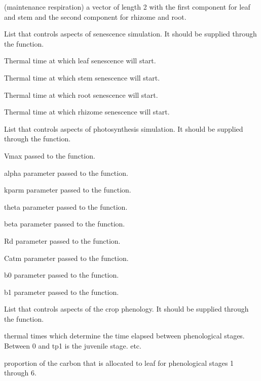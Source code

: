 \documentclass[letterpaper]{book}
\begin{document}
\begin{Arguments}
\begin{ldescription}
 (maintenance respiration) a vector of length
2 with the first component for leaf and stem and the
second component for rhizome and root.

\item[\code{seneControl}] List that controls aspects of
senescence simulation. It should be supplied through the
 function.

 Thermal time at which leaf senescence will
start.

 Thermal time at which stem senescence will
start.

 Thermal time at which root senescence will
start.

 Thermal time at which rhizome
senescence will start.

\item[\code{photoControl}] List that controls aspects of
photosynthesis simulation. It should be supplied through
the  function.

 Vmax passed to the 
function.

 alpha parameter passed to the
 function.

 kparm parameter passed to the
 function.

 theta parameter passed to the
 function.

 beta parameter passed to the
 function.

 Rd parameter passed to the
 function.

 Catm parameter passed to the
 function.

 b0 parameter passed to the
 function.

 b1 parameter passed to the
 function.

\item[\code{phenoControl}] List that controls aspects of the
crop phenology. It should be supplied through the
 function.

 thermal times which determine the time
elapsed between phenological stages. Between 0 and tp1 is
the juvenile stage. etc.

 proportion of the carbon that is
allocated to leaf for phenological stages 1 through 6.


\end{ldescription}
\end{Arguments}
\end{document}
